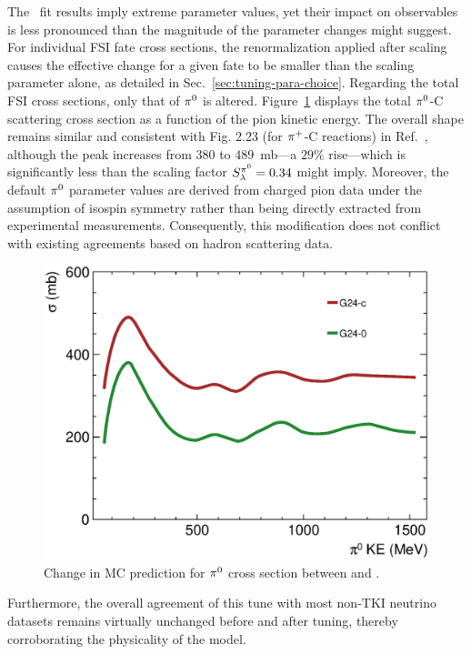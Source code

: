 The \gC\ fit results imply extreme parameter values, yet their impact on observables is less pronounced than the magnitude of the parameter changes might suggest. 
For individual FSI fate cross sections, the renormalization applied after scaling causes the effective change for a given fate to be smaller than the scaling parameter alone, as detailed in Sec.~\ref{sec:tuning-para-choice}.
Regarding the total FSI cross sections, only that of $\pi^0$ is altered.
Figure~\ref{fig:pizmfp_change} displays the total $\pi^0$-C scattering cross section as a function of the pion kinetic energy. 
The overall shape remains similar and consistent with Fig. 2.23 (for $\pi^+$-C reactions) in Ref.~\cite{Andreopoulos:2015wxa}, although the peak increases from $380$ to $489$~mb---a $29\%$ rise---which is significantly less than the scaling factor $S_\lambda^{\pi^{0}}=0.34$ might imply. 
Moreover, the default $\pi^0$ parameter values are derived from charged pion data under the assumption of isospin symmetry rather than being directly extracted from experimental measurements. 
Consequently, this modification does not conflict with existing agreements based on hadron scattering data.
\begin{figure}[!htb] 	
    \centering 		
    \includegraphics[width=\sgfigwid\textwidth]{figures/tuning/pi0mfp_change_covfix.eps}
    \caption{\label{fig:pizmfp_change} Change in MC prediction for $\pi^0$ cross section between \gZero and \gC. } 
\end{figure}
Furthermore, the overall agreement of this tune with most non-TKI neutrino datasets remains virtually unchanged before and after tuning, thereby corroborating the physicality of the model.

